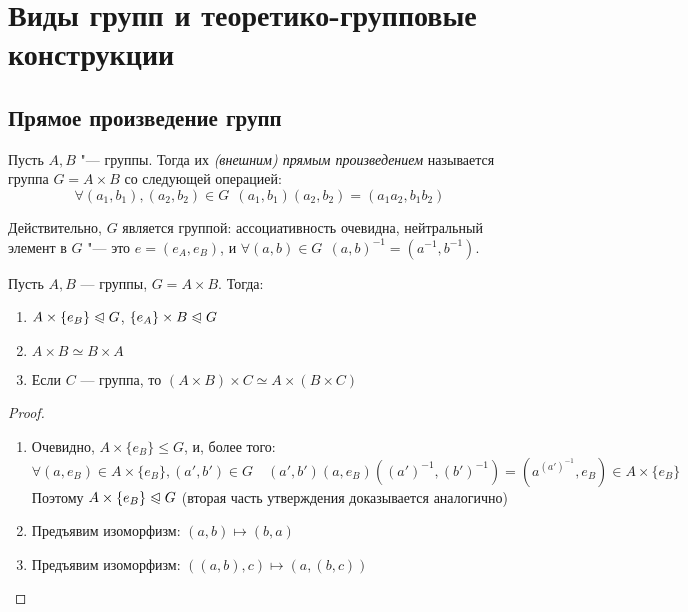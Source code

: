 \section{Виды групп и теоретико-групповые конструкции}

\subsection{Прямое произведение групп}

\begin{definition}
	Пусть $A, B$ "--- группы. Тогда их \textit{(внешним) прямым произведением} называется группа $G = A \times B$ со следующей операцией: 
	\[
		\forall (a_1, b_1), (a_2, b_2) \in G\ \ (a_1, b_1)(a_2, b_2) = (a_1a_2, b_1b_2)
	\]
\end{definition}

\begin{note}
	Действительно, $G$ является группой: ассоциативность очевидна, нейтральный элемент в $G$ "--- это $e = (e_A, e_B)$, и $\forall (a, b) \in G\ \ (a, b)^{-1} = (a^{-1}, b^{-1})$.
\end{note}

\begin{proposition}
	Пусть $A, B$ --- группы, $G = A\times B$. Тогда:
	\begin{enumerate}
		\item $A \times \{e_B\} \trianglelefteqslant G$, $\{e_A\} \times B \trianglelefteqslant G$
		
		\item $A \times B \simeq B \times A$
		
		\item Если $C$ --- группа, то $(A \times B) \times C \simeq A \times (B \times C)$
	\end{enumerate}
\end{proposition}

\begin{proof}~
	\begin{enumerate}
		\item Очевидно, $A \times \{e_B\} \le G$, и, более того:
		\[
			\forall (a, e_B) \in A \times \{e_B\}, (a', b') \in G \quad (a', b')(a, e_B)((a')^{-1}, (b')^{-1}) = (a^{(a')^{-1}}, e_B) \in A \times \{e_B\}
		\]
		Поэтому $A \times \{e_B\} \trianglelefteqslant G$ (вторая часть утверждения доказывается аналогично)
		\item Предъявим изоморфизм: $(a, b) \mapsto (b, a)$
		\item Предъявим изоморфизм: $((a, b), c) \mapsto (a, (b, c))$
	\end{enumerate}
\end{proof}

